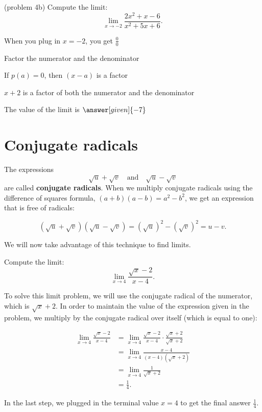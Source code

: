 \documentclass{ximera}
\begin{document}
\begin{problem}(problem 4b)
  Compute the limit:
  \[
  \lim_{x \to -2} \frac{2x^2 + x - 6}{x^2 + 5x + 6}.
  \]
  
    \begin{hint}
      When you plug in $x = -2$, you get $\frac00$
    \end{hint}
    \begin{hint}
      Factor the numerator and the denominator
    \end{hint}
    \begin{hint}
      If $p(a) = 0$, then $(x-a)$ is a factor
    \end{hint}
    \begin{hint}
      $x+2$ is a factor of both the numerator and the denominator
    \end{hint}
    
		The value of the limit is
		 $\answer[given]{-7}$
		
\end{problem}


\section{Conjugate radicals}


The expressions 
\[\sqrt u + \sqrt v \quad \text{and} \quad \sqrt u - \sqrt v\]
 are called
\textbf{conjugate radicals}. When we multiply conjugate radicals
using the difference of squares formula, $(a+b)(a-b) = a^2 - b^2$,
we get an expression that is free of radicals: 

\[(\sqrt u + \sqrt v)(\sqrt u - \sqrt v) = (\sqrt u)^2 - (\sqrt v)^2 = u - v.\]

We will now take advantage of this technique to find limits.

\begin{example}[example 5]
Compute the limit:
\[\lim_{x \to 4} \frac{\sqrt{x} - 2}{x-4}.\]

To solve this limit problem, we will use the conjugate radical of the
numerator, which is $\sqrt{x} + 2$.  In order to maintain the value of
the expression given in the problem, we multiply by the conjugate radical
over itself (which is equal to one):



\begin{align*}
\lim_{x \to 4} \frac{\sqrt{x}- 2}{x-4} &=
\lim_{x \to 4} \frac{\sqrt{x} -2}{x-4}\cdot \frac{\sqrt{x} +2}{\sqrt{x}+2} \\
 &= \lim_{x \to 4} \frac{x-4}{(x-4)(\sqrt{x}+2)} \\
&= \lim_{x \to 4}\frac{1}{\sqrt{x}+2} \\
&= \frac 14.
\end{align*}

In the last step, we plugged in the terminal value $x=4$ to get the final answer $\frac14$.

\end{example}
\end{document}
